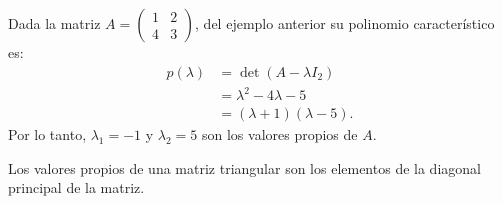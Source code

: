 \documentclass[compacto,10pt]{pubciencias-notas}
\begin{document}
\begin{ejem}\hspace{0pt} Dada la matriz $A = \begin{pmatrix} 1&2\\4&3 \end{pmatrix}$, del ejemplo anterior su polinomio característico es:
\begin{align*}
    p(\lambda)  &=  \det(A - \lambda I_{2})\\
                &= \lambda^2 - 4\lambda - 5\\
                &= (\lambda + 1) (\lambda - 5).
\end{align*}
Por lo tanto, $\lambda_1 = -1$ y $\lambda_2 = 5$ son los valores propios de $A$.
\end{ejem}

\begin{prop}
Los valores propios de una matriz triangular son los elementos de la diagonal principal de la matriz. 
\end{prop}
%

\end{document}
